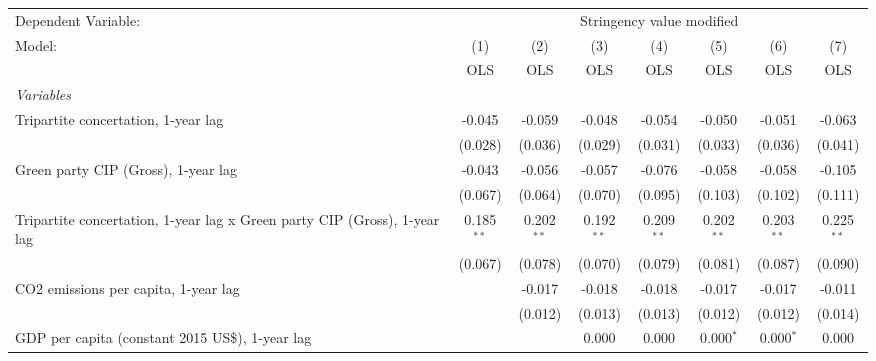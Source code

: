 
\begingroup
\centering
\begin{tabular}{lccccccc}
   \toprule
   Dependent Variable: & \multicolumn{7}{c}{Stringency value modified}\\
   Model:                                                                    & (1)          & (2)          & (3)          & (4)          & (5)          & (6)          & (7)\\  
                                                                             &  OLS         & OLS          & OLS          & OLS          & OLS          & OLS          & OLS\\  
   \midrule
   \emph{Variables}\\
   Tripartite concertation, 1-year lag                                       & -0.045       & -0.059       & -0.048       & -0.054       & -0.050       & -0.051       & -0.063\\   
                                                                             & (0.028)      & (0.036)      & (0.029)      & (0.031)      & (0.033)      & (0.036)      & (0.041)\\   
   Green party CIP (Gross), 1-year lag                                       & -0.043       & -0.056       & -0.057       & -0.076       & -0.058       & -0.058       & -0.105\\   
                                                                             & (0.067)      & (0.064)      & (0.070)      & (0.095)      & (0.103)      & (0.102)      & (0.111)\\   
   Tripartite concertation, 1-year lag x Green party CIP (Gross), 1-year lag & 0.185$^{**}$ & 0.202$^{**}$ & 0.192$^{**}$ & 0.209$^{**}$ & 0.202$^{**}$ & 0.203$^{**}$ & 0.225$^{**}$\\   
                                                                             & (0.067)      & (0.078)      & (0.070)      & (0.079)      & (0.081)      & (0.087)      & (0.090)\\   
   CO2 emissions per capita, 1-year lag                                      &              & -0.017       & -0.018       & -0.018       & -0.017       & -0.017       & -0.011\\   
                                                                             &              & (0.012)      & (0.013)      & (0.013)      & (0.012)      & (0.012)      & (0.014)\\   
   GDP per capita (constant 2015 US\$), 1-year lag                           &              &              & 0.000        & 0.000        & 0.000$^{*}$  & 0.000$^{*}$  & 0.000\\   

\end{tabular}
